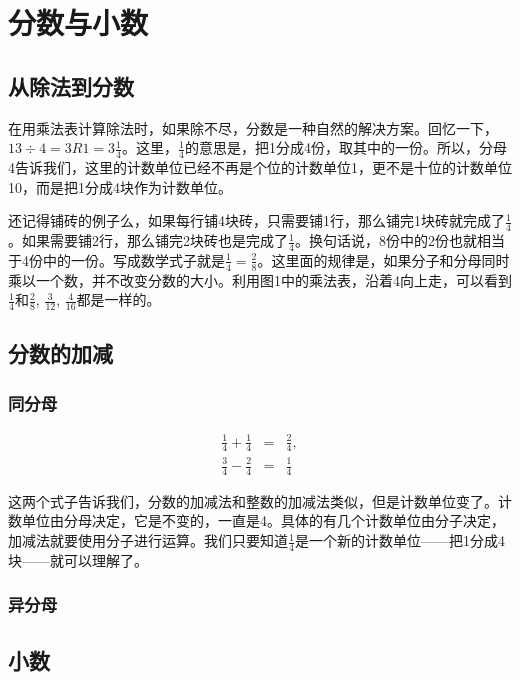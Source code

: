 
\chapter{分数与小数}
\section{从除法到分数}

在用乘法表计算除法时，如果除不尽，分数是一种自然的解决方案。回忆一下，$13\div4=3R1=3\frac{1}{4}$。这里，$\frac{1}{4}$的意思是，把1分成4份，取其中的一份。所以，分母4告诉我们，这里的计数单位已经不再是个位的计数单位1，更不是十位的计数单位10，而是把1分成4块作为计数单位。

还记得铺砖的例子么，如果每行铺4块砖，只需要铺1行，那么铺完1块砖就完成了$\frac{1}{4}$。如果需要铺2行，那么铺完2块砖也是完成了$\frac{1}{4}$。换句话说，8份中的2份也就相当于4份中的一份。写成数学式子就是$\frac{1}{4}=\frac{2}{8}$。这里面的规律是，如果分子和分母同时乘以一个数，并不改变分数的大小。利用图1中的乘法表，沿着4向上走，可以看到$\frac{1}{4}$和$\frac{2}{8}$, $\frac{3}{12}$, $\frac{4}{16}$都是一样的。


\section{分数的加减}

\subsection{同分母}

\begin{eqnarray}
\frac{1}{4} + \frac{1}{4} & = & \frac{2}{4},\\
\frac{3}{4} - \frac{2}{4} & = & \frac{1}{4}
\end{eqnarray}
    
    这两个式子告诉我们，分数的加减法和整数的加减法类似，但是计数单位变了。计数单位由分母决定，它是不变的，一直是4。具体的有几个计数单位由分子决定，加减法就要使用分子进行运算。我们只要知道$\frac{1}{4}$是一个新的计数单位——把1分成4块——就可以理解了。

\subsection{异分母}

\section{小数}



